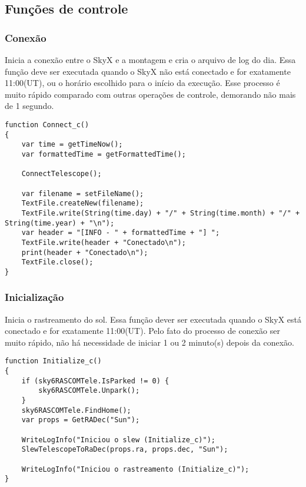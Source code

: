\documentclass{article}
\begin{document}
\subsection{Funções de controle}

\subsubsection{Conexão}

Inicia a conexão entre o SkyX e a montagem e cria o arquivo de log do dia. Essa função deve ser executada quando o SkyX não está conectado e for exatamente 11:00(UT), ou o horário escolhido para o início da execução. Esse processo é muito rápido comparado com outras operações de controle, demorando não mais de 1 segundo.

\begin{lstlisting}
function Connect_c()
{
    var time = getTimeNow();
    var formattedTime = getFormattedTime();

    ConnectTelescope();

    var filename = setFileName();
    TextFile.createNew(filename);
    TextFile.write(String(time.day) + "/" + String(time.month) + "/" + String(time.year) + "\n");
    var header = "[INFO - " + formattedTime + "] ";
    TextFile.write(header + "Conectado\n");
    print(header + "Conectado\n");
    TextFile.close();
}
\end{lstlisting}

\subsubsection{Inicialização}

Inicia o rastreamento do sol. Essa função dever ser executada quando o SkyX está conectado e for exatamente 11:00(UT). Pelo fato do processo de conexão ser muito rápido, não há necessidade de iniciar 1 ou 2 minuto(s) depois da conexão.

\begin{lstlisting}
function Initialize_c()
{
    if (sky6RASCOMTele.IsParked != 0) {
        sky6RASCOMTele.Unpark();
    }
    sky6RASCOMTele.FindHome();
    var props = GetRADec("Sun");

    WriteLogInfo("Iniciou o slew (Initialize_c)");
    SlewTelescopeToRaDec(props.ra, props.dec, "Sun");

    WriteLogInfo("Iniciou o rastreamento (Initialize_c)");
}

\end{lstlisting}
\end{document}
